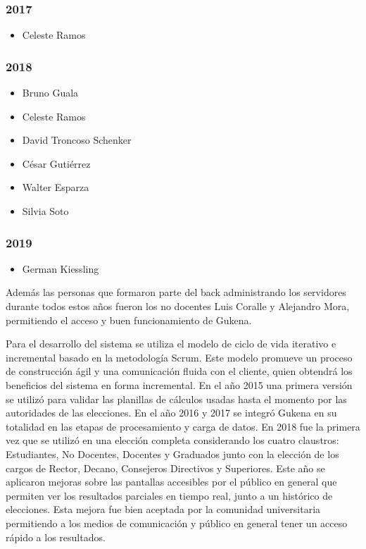 \subsubsection{2017}
\begin{itemize}
    \item Celeste Ramos
\end{itemize}
\subsubsection{2018}
\begin{itemize}
    \item Bruno Guala
    \item Celeste Ramos
    \item David Troncoso Schenker
    \item César Gutiérrez 
    \item Walter Esparza 
    \item Silvia Soto
\end{itemize}
\subsubsection{2019}
\begin{itemize}
    \item German Kiessling
\end{itemize}
Además las personas que formaron parte del back administrando los servidores durante todos estos años fueron los no docentes Luis Coralle y Alejandro Mora, permitiendo el acceso y buen funcionamiento de Gukena.



Para el desarrollo del sistema se utiliza el modelo de ciclo de vida iterativo e incremental basado en la metodología Scrum. Este modelo promueve un proceso de construcción ágil y una comunicación fluida con el cliente, quien obtendrá los beneficios del sistema en forma incremental. En el año 2015 una primera versión se utilizó para validar las planillas de cálculos usadas hasta el momento por las autoridades de las elecciones. En el año 2016 y 2017 se integró Gukena en su totalidad en las etapas de procesamiento y carga de datos.  En 2018 fue la primera vez que se utilizó en una elección completa considerando los cuatro claustros: Estudiantes, No Docentes, Docentes y Graduados junto con la elección de los cargos de Rector, Decano, Consejeros Directivos y Superiores. Este año se aplicaron mejoras sobre las pantallas accesibles por el público en general que permiten ver los resultados parciales en tiempo real, junto a un histórico de elecciones. Esta mejora fue bien aceptada por la comunidad universitaria permitiendo a los medios de comunicación y público en general tener un acceso rápido a los resultados.


